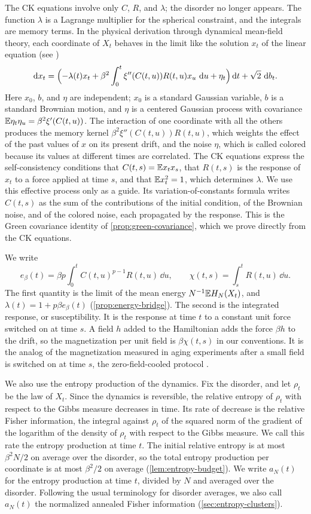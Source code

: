 The CK equations involve only $C$, $R$, and $\lambda$; the disorder no longer appears. The function $\lambda$ is a Lagrange multiplier for the spherical constraint, and the integrals are memory terms. In the physical derivation through dynamical mean-field theory, each coordinate of $X_t$ behaves in the limit like the solution $x_t$ of the linear equation (see \cite[arXiv version~2, Section~9.5]{cugliandolo2004})
\[
 \mathop{}\!\mathrm d x_t=\Bigl(-\lambda(t)x_t+\beta^2\int_0^t\xi''(C(t,u))R(t,u)x_u\,\mathop{}\!\mathrm d u+\eta_t\Bigr)\mathop{}\!\mathrm d t+\sqrt2\,\mathop{}\!\mathrm d b_t.
\]
Here $x_0$, $b$, and $\eta$ are independent; $x_0$ is a standard Gaussian variable, $b$ is a standard Brownian motion, and $\eta$ is a centered Gaussian process with covariance $\mathbb E\eta_t\eta_u=\beta^2\xi'(C(t,u))$. The interaction of one coordinate with all the others produces the memory kernel $\beta^2\xi''(C(t,u))R(t,u)$, which weights the effect of the past values of $x$ on its present drift, and the noise $\eta$, which is called colored because its values at different times are correlated. The CK equations express the self-consistency conditions that $C(t,s)=\mathbb E x_tx_s$, that $R(t,s)$ is the response of $x_t$ to a force applied at time $s$, and that $\mathbb E x_t^2=1$, which determines $\lambda$. We use this effective process only as a guide. Its variation-of-constants formula writes $C(t,s)$ as the sum of the contributions of the initial condition, of the Brownian noise, and of the colored noise, each propagated by the response. This is the Green covariance identity of \cref{prop:green-covariance}, which we prove directly from the CK equations.

We write
\[
 e_\beta(t)=\beta p\int_0^tC(t,u)^{p-1}R(t,u)\,\dd u,\qquad
 \chi(t,s)=\int_s^tR(t,u)\,\dd u.
\]
The first quantity is the limit of the mean energy $N^{-1}\mathbb E H_N(X_t)$, and $\lambda(t)=1+p\beta e_\beta(t)$ (\cref{prop:energy-bridge}). The second is the integrated response, or susceptibility. It is the response at time $t$ to a constant unit force switched on at time $s$. A field $h$ added to the Hamiltonian adds the force $\beta h$ to the drift, so the magnetization per unit field is $\beta\chi(t,s)$ in our conventions. It is the analog of the magnetization measured in aging experiments after a small field is switched on at time $s$, the zero-field-cooled protocol \cite{vincent1997}.

We also use the entropy production of the dynamics. Fix the disorder, and let $\rho_t$ be the law of $X_t$. Since the dynamics is reversible, the relative entropy of $\rho_t$ with respect to the Gibbs measure decreases in time. Its rate of decrease is the relative Fisher information, the integral against $\rho_t$ of the squared norm of the gradient of the logarithm of the density of $\rho_t$ with respect to the Gibbs measure. We call this rate the entropy production at time $t$. The initial relative entropy is at most $\beta^2N/2$ on average over the disorder, so the total entropy production per coordinate is at most $\beta^2/2$ on average (\cref{lem:entropy-budget}). We write $a_N(t)$ for the entropy production at time $t$, divided by $N$ and averaged over the disorder. Following the usual terminology for disorder averages, we also call $a_N(t)$ the normalized annealed Fisher information (\cref{sec:entropy-clusters}).

